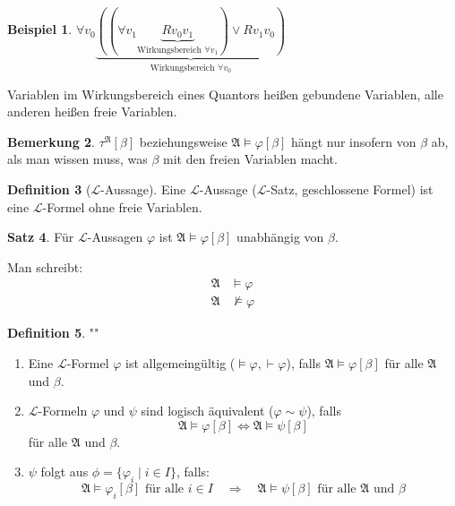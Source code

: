 \documentclass[12pt,parskip=full]{scrartcl}
\theoremstyle{definition}
\newtheorem{theorem}{Satz}[section]
\newtheorem{definition}[theorem]{Definition}
\newtheorem{example}[theorem]{Beispiel}
\newtheorem{remark}[theorem]{Bemerkung}
\begin{document}
	\begin{example}
		$\forall v_0 \underbrace{((\forall v_1 \underbrace{R v_0 v_1}_\text{Wirkungsbereich $\forall v_1$}) \lor R v_1 v_0)}_\text{Wirkungsbereich $\forall v_0$}$
		
		Variablen im Wirkungsbereich eines Quantors heißen gebundene Variablen, alle anderen heißen freie Variablen.
	\end{example}

	\begin{remark}
		$\tau^\mathfrak{A}[\beta]$ beziehungsweise $\mathfrak{A} \models \varphi[\beta]$ hängt nur insofern von $\beta$ ab, als man wissen muss, was $\beta$ mit den freien Variablen macht.
	\end{remark}

	\begin{definition}[$\mathcal{L}$-Aussage]
		Eine $\mathcal{L}$-Aussage ($\mathcal{L}$-Satz, geschlossene Formel) ist eine $\mathcal{L}$-Formel ohne freie Variablen.
	\end{definition}
	
	\begin{theorem}
		Für $\mathcal{L}$-Aussagen $\varphi$ ist $\mathfrak{A} \models \varphi[\beta]$ unabhängig von $\beta$.
		
		Man schreibt:
		\begin{align*}
			\mathfrak{A} & \models \varphi \\
			\mathfrak{A} & \not\models \varphi
		\end{align*}
	\end{theorem}

	\begin{definition}""
		\begin{enumerate}
			\item Eine $\mathcal{L}$-Formel $\varphi$ ist allgemeingültig ($\models \varphi, \vdash \varphi$), falls $\mathfrak{A} \models \varphi[\beta]$ für alle $\mathfrak{A}$ und $\beta$.
			\item $\mathcal{L}$-Formeln $\varphi$ und $\psi$ sind logisch äquivalent ($\varphi \sim \psi$), falls
			\begin{equation*}
				\mathfrak{A} \models \varphi[\beta] \Leftrightarrow \mathfrak{A} \models \psi[\beta]
			\end{equation*}
			für alle $\mathfrak{A}$ und $\beta$.
			\item $\psi$ folgt aus $\phi = \{ \varphi_i \mid i \in I \}$, falls:
			\begin{equation*}
				\mathfrak{A} \models \varphi_i[\beta] \text{ für alle $i \in I$} \quad\Longrightarrow\quad \mathfrak{A} \models \psi[\beta] \text{ für alle $\mathfrak{A}$ und $\beta$}
			\end{equation*}
		\end{enumerate}
	\end{definition}
\end{document}
